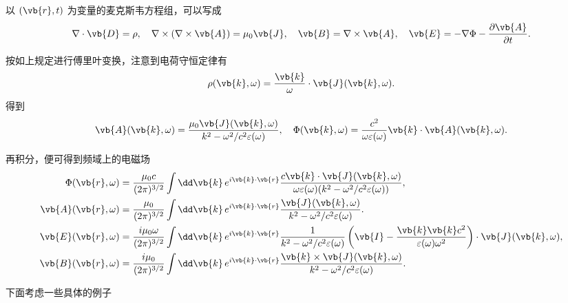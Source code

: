 以 \((\vb{r},t)\) 为变量的麦克斯韦方程组，可以写成
\begin{align*}
	\nabla \cdot \vb{D} = \rho, \quad
	\nabla \times (\nabla \times \vb{A}) = \mu_{0} \vb{J}, \quad
	\vb{B} = \nabla \times \vb{A}, \quad
	\vb{E} = -\nabla \Phi - \frac{\partial \vb{A}}{\partial t}.
\end{align*}

按如上规定进行傅里叶变换，注意到电荷守恒定律有
\begin{align*}
	\rho(\vb{k},\omega) = \frac{\vb{k}}{\omega} \cdot \vb{J}(\vb{k},\omega).
\end{align*}
得到
\begin{align*}
	\vb{A}(\vb{k},\omega) = \frac{\mu_{0} \vb{J}(\vb{k},\omega)}{k^{2} - \omega^{2}/c^{2} \varepsilon(\omega)}, \quad
	\Phi(\vb{k},\omega) = \frac{c^{2}}{\omega \varepsilon(\omega)} \vb{k} \cdot \vb{A}(\vb{k},\omega).
\end{align*}

再积分，便可得到频域上的电磁场
\begin{align*}
	\Phi(\vb{r},\omega) &= \frac{\mu_{0} c}{(2\pi)^{3/2}} \int \dd \vb{k} \, e^{i\vb{k}\cdot\vb{r}} \frac{c \vb{k} \cdot \vb{J}(\vb{k},\omega)}{\omega \varepsilon(\omega) (k^{2} - \omega^{2}/c^{2} \varepsilon(\omega))}, \\
	\vb{A}(\vb{r},\omega) &= \frac{\mu_{0}}{(2\pi)^{3/2}} \int \dd \vb{k} \, e^{i\vb{k}\cdot\vb{r}} \frac{\vb{J}(\vb{k},\omega)}{k^{2} - \omega^{2}/c^{2} \varepsilon(\omega)}.\\
	\vb{E}(\vb{r},\omega) &= \frac{i \mu_{0} \omega}{(2\pi)^{3/2}} \int \dd \vb{k} \, e^{i\vb{k}\cdot\vb{r}} \frac{1}{k^{2} - \omega^{2}/c^{2} \varepsilon(\omega)}\left( \vb{I} - \frac{\vb{k} \vb{k} c^{2}}{\varepsilon(\omega) \omega^{2}} \right) \cdot \vb{J}(\vb{k},\omega), \\
	\vb{B}(\vb{r},\omega) &= \frac{i \mu_{0}}{(2\pi)^{3/2}} \int \dd \vb{k} \, e^{i\vb{k}\cdot\vb{r}} \frac{\vb{k} \times \vb{J}(\vb{k},\omega)}{k^{2} - \omega^{2}/c^{2} \varepsilon(\omega)}.
\end{align*}

下面考虑一些具体的例子

